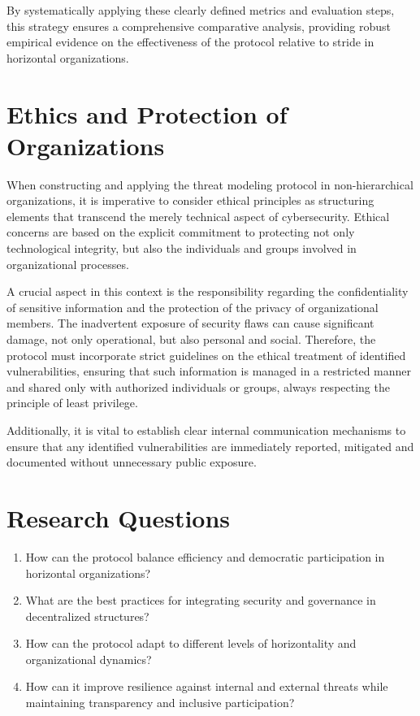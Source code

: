 By systematically applying these clearly defined metrics and evaluation steps,
this strategy ensures a comprehensive comparative analysis, providing robust
empirical evidence on the effectiveness of the protocol relative to \gls{stride}
in horizontal organizations.

\section{Ethics and Protection of Organizations}
\label{sec:ethics_protection}

When constructing and applying the threat modeling protocol in non-hierarchical
organizations, it is imperative to consider ethical principles as structuring
elements that transcend the merely technical aspect of cybersecurity. Ethical
concerns are based on the explicit commitment to protecting not only
technological integrity, but also the individuals and groups involved in
organizational processes.

A crucial aspect in this context is the responsibility regarding the
confidentiality of sensitive information and the protection of the privacy of
organizational members. The inadvertent exposure of security flaws can cause
significant damage, not only operational, but also personal and social.
Therefore, the protocol must incorporate strict guidelines on the ethical
treatment of identified vulnerabilities, ensuring that such information is
managed in a restricted manner and shared only with authorized individuals or
groups, always respecting the principle of least privilege.

Additionally, it is vital to establish clear internal communication mechanisms
to ensure that any identified vulnerabilities are immediately reported,
mitigated and documented without unnecessary public exposure.

\section{Research Questions}
\label{sec:research_questions}

\begin{enumerate}
    \item How can the protocol balance efficiency and democratic participation
in horizontal organizations?
    \item What are the best practices for integrating security and governance
in decentralized structures?
    \item How can the protocol adapt to different levels of horizontality and
organizational dynamics?
    \item How can it improve resilience against internal and external threats
while maintaining transparency and inclusive participation?
\end{enumerate}

